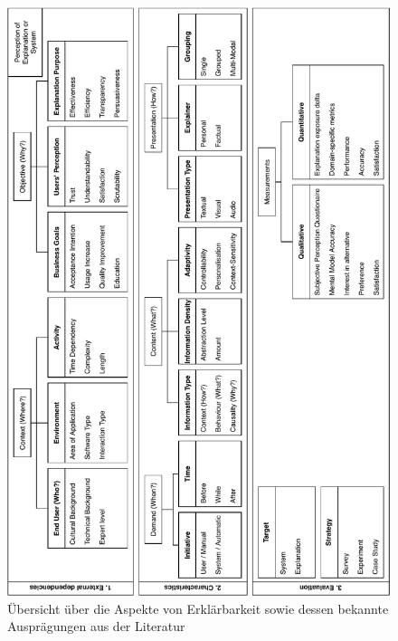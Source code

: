\begin{figure}[htb!]
    \begin{center}
        \includegraphics[width=0.95\linewidth]{contents/05_model_description/res/model_overview_complete.pdf}
    \end{center}
    \caption{Übersicht über die Aspekte von Erklärbarkeit sowie dessen bekannte Ausprägungen aus der Literatur}
    \label{fig:model_overview_complete}
\end{figure}



